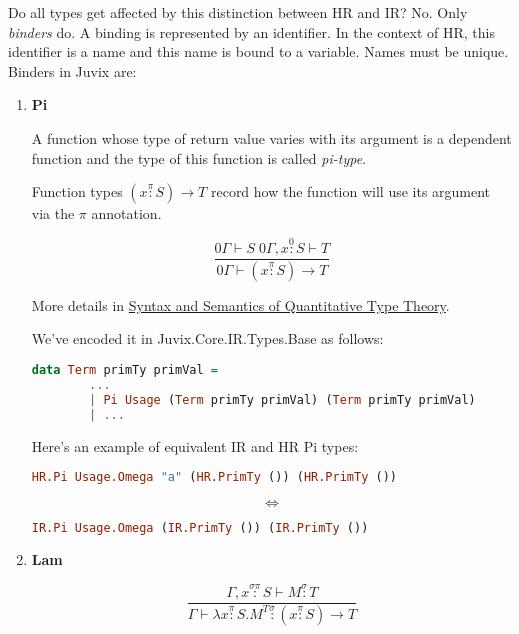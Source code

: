 \documentclass[acmsmall]{acmart}
\numberwithin{figure}{subsection}
\begin{document}
Do all types get affected by this distinction between HR and IR? No. Only \textit{binders} do. A binding is represented by an identifier. In the context of HR, this identifier is a name and this name is bound to a variable. Names must be unique. Binders in Juvix are:
\begin{enumerate}
    \item \textbf{Pi}

    A function whose type of return value varies with its argument is a dependent function and the type of this function is called \textit{pi-type}.
    
    Function types $(x \stackrel{\pi}{:} S) \rightarrow T$ record how the function will use its argument via the $\pi$ annotation.

    \begin{equation*}
       \dfrac{0\Gamma \vdash S \; 0 \Gamma, x \stackrel{0}{:} S \vdash T }{0 \Gamma \vdash (x \stackrel{\pi}{:} S) \rightarrow T} 
    \end{equation*}

    More details in \href{https://bentnib.org/quantitative-type-theory.pdf}{Syntax and Semantics of Quantitative Type Theory}.

    \bigskip

    We've encoded it in Juvix.Core.IR.Types.Base as follows:
    \begin{lstlisting}[language=haskell]
data Term primTy primVal = 
        ...
        | Pi Usage (Term primTy primVal) (Term primTy primVal)
        | ...
    \end{lstlisting}

    Here's an example of equivalent IR and HR Pi types:

    \begin{lstlisting}[language=haskell]
        HR.Pi Usage.Omega "a" (HR.PrimTy ()) (HR.PrimTy ())
    \end{lstlisting}
    \begin{equation*}
      \Leftrightarrow  
    \end{equation*}
    \begin{lstlisting}[language=haskell]
        IR.Pi Usage.Omega (IR.PrimTy ()) (IR.PrimTy ())
    \end{lstlisting}
    \item \textbf{Lam}

    \begin{equation*}
       \dfrac{\Gamma, x \stackrel{\sigma \pi}{:} S \vdash M \stackrel{\sigma}{:} T }{\Gamma \vdash \lambda x \stackrel{\pi}{:} S .M^T \stackrel{\sigma}{:} (x \stackrel{\pi}{:} S) \rightarrow T} 
    \end{equation*}


\end{enumerate}
\end{document}
